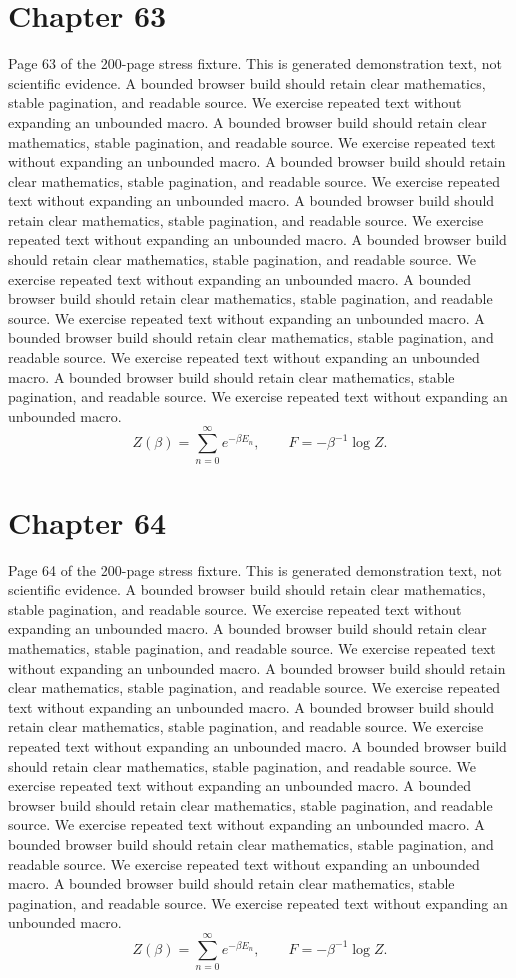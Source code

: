 \documentclass[11pt]{article}
\begin{document}
\section*{Chapter 63}
Page 63 of the 200-page stress fixture. This is generated demonstration text, not scientific evidence.
A bounded browser build should retain clear mathematics, stable pagination, and readable source. We exercise repeated text without expanding an unbounded macro.
A bounded browser build should retain clear mathematics, stable pagination, and readable source. We exercise repeated text without expanding an unbounded macro.
A bounded browser build should retain clear mathematics, stable pagination, and readable source. We exercise repeated text without expanding an unbounded macro.
A bounded browser build should retain clear mathematics, stable pagination, and readable source. We exercise repeated text without expanding an unbounded macro.
A bounded browser build should retain clear mathematics, stable pagination, and readable source. We exercise repeated text without expanding an unbounded macro.
A bounded browser build should retain clear mathematics, stable pagination, and readable source. We exercise repeated text without expanding an unbounded macro.
A bounded browser build should retain clear mathematics, stable pagination, and readable source. We exercise repeated text without expanding an unbounded macro.
A bounded browser build should retain clear mathematics, stable pagination, and readable source. We exercise repeated text without expanding an unbounded macro.
\[Z(\beta)=\sum_{n=0}^{\infty}e^{-\beta E_n},\qquad F=-\beta^{-1}\log Z.\]
\newpage
\section*{Chapter 64}
Page 64 of the 200-page stress fixture. This is generated demonstration text, not scientific evidence.
A bounded browser build should retain clear mathematics, stable pagination, and readable source. We exercise repeated text without expanding an unbounded macro.
A bounded browser build should retain clear mathematics, stable pagination, and readable source. We exercise repeated text without expanding an unbounded macro.
A bounded browser build should retain clear mathematics, stable pagination, and readable source. We exercise repeated text without expanding an unbounded macro.
A bounded browser build should retain clear mathematics, stable pagination, and readable source. We exercise repeated text without expanding an unbounded macro.
A bounded browser build should retain clear mathematics, stable pagination, and readable source. We exercise repeated text without expanding an unbounded macro.
A bounded browser build should retain clear mathematics, stable pagination, and readable source. We exercise repeated text without expanding an unbounded macro.
A bounded browser build should retain clear mathematics, stable pagination, and readable source. We exercise repeated text without expanding an unbounded macro.
A bounded browser build should retain clear mathematics, stable pagination, and readable source. We exercise repeated text without expanding an unbounded macro.
\[Z(\beta)=\sum_{n=0}^{\infty}e^{-\beta E_n},\qquad F=-\beta^{-1}\log Z.\]
\newpage
\end{document}
